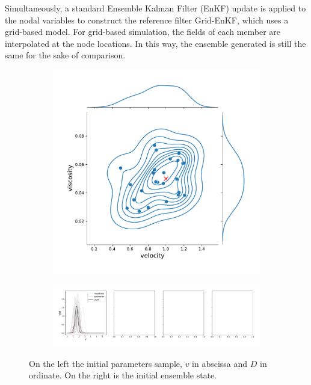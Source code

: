 Simultaneously, a standard Ensemble Kalman Filter (EnKF) update is applied to the nodal variables to construct the reference filter Grid-EnKF, which uses a grid-based model. For grid-based simulation, the fields of each member are interpolated at the node locations. In this way, the ensemble generated is still the same for the sake of comparison.


\begin{figure}[ht!]
	\centering
	\begin{subfigure}{0.49\textwidth}
		\includegraphics[width=\textwidth]{images/app1d/param.pdf}
	\end{subfigure}
	\hfill
	\begin{subfigure}{0.49\textwidth}
		\includegraphics[width=\textwidth]{images/app1d/prior.pdf}
	\end{subfigure}
	\caption{On the left the initial parameters sample, $v$ in abscissa and $D$ in ordinate. On the right is the initial ensemble state.}
	\label{fig:initial_gen}
\end{figure}

